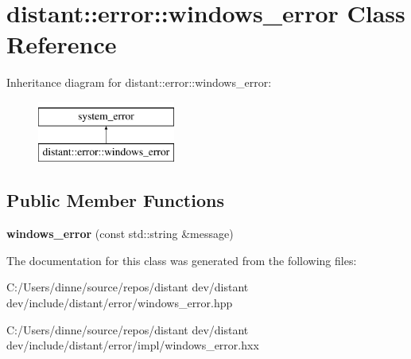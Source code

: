 \hypertarget{classdistant_1_1error_1_1windows__error}{}\section{distant\+:\+:error\+:\+:windows\+\_\+error Class Reference}
\label{classdistant_1_1error_1_1windows__error}
Inheritance diagram for distant\+:\+:error\+:\+:windows\+\_\+error\+:\begin{figure}[H]
\begin{center}
\leavevmode
\includegraphics[height=2.000000cm]{classdistant_1_1error_1_1windows__error}
\end{center}
\end{figure}
\subsection*{Public Member Functions}
\begin{DoxyCompactItemize}
\item 
\mbox{\label{classdistant_1_1error_1_1windows__error_a44323df6831761fbc7c820b5753d3a2d}} 
{\bfseries windows\+\_\+error} (const std\+::string \&message)
\end{DoxyCompactItemize}


The documentation for this class was generated from the following files\+:\begin{DoxyCompactItemize}
\item 
C\+:/\+Users/dinne/source/repos/distant dev/distant dev/include/distant/error/windows\+\_\+error.\+hpp\item 
C\+:/\+Users/dinne/source/repos/distant dev/distant dev/include/distant/error/impl/windows\+\_\+error.\+hxx\end{DoxyCompactItemize}
